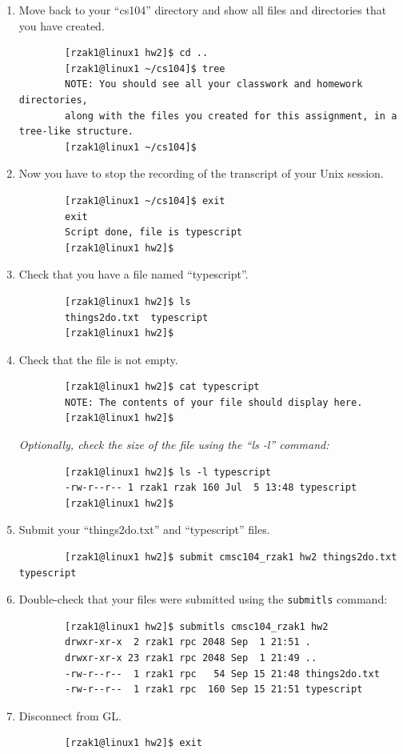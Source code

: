 \documentclass[letter,11pt]{article}
\begin{document}
\begin{enumerate}
    \item Move back to your ``cs104'' directory and show all files and directories that you have created.
    \begin{verbatim}
        [rzak1@linux1 hw2]$ cd ..
        [rzak1@linux1 ~/cs104]$ tree
        NOTE: You should see all your classwork and homework directories, 
        along with the files you created for this assignment, in a tree-like structure.
        [rzak1@linux1 ~/cs104]$\end{verbatim}
    \item Now you have to stop the recording of the transcript of your Unix session.
    \begin{verbatim}
        [rzak1@linux1 ~/cs104]$ exit
        exit
        Script done, file is typescript
        [rzak1@linux1 hw2]$\end{verbatim}
    \item Check that you have a file named ``typescript''.
    \begin{verbatim}
        [rzak1@linux1 hw2]$ ls
        things2do.txt  typescript
        [rzak1@linux1 hw2]$\end{verbatim}
    \item Check that the file is not empty.
    \begin{verbatim}
        [rzak1@linux1 hw2]$ cat typescript
        NOTE: The contents of your file should display here.
        [rzak1@linux1 hw2]$\end{verbatim}
    \textit{Optionally, check the size of the file using the ``ls -l'' command:}
    \begin{verbatim}
        [rzak1@linux1 hw2]$ ls -l typescript
        -rw-r--r-- 1 rzak1 rzak 160 Jul  5 13:48 typescript
        [rzak1@linux1 hw2]$\end{verbatim}
    \item Submit your ``things2do.txt'' and ``typescript'' files.
    \begin{verbatim}
        [rzak1@linux1 hw2]$ submit cmsc104_rzak1 hw2 things2do.txt typescript\end{verbatim}
    \item Double-check that your files were submitted using the \texttt{submitls} command:
    \begin{verbatim}
        [rzak1@linux1 hw2]$ submitls cmsc104_rzak1 hw2
        drwxr-xr-x  2 rzak1 rpc 2048 Sep  1 21:51 .
        drwxr-xr-x 23 rzak1 rpc 2048 Sep  1 21:49 ..
        -rw-r--r--  1 rzak1 rpc   54 Sep 15 21:48 things2do.txt
        -rw-r--r--  1 rzak1 rpc  160 Sep 15 21:51 typescript\end{verbatim}
    \item Disconnect from GL.
    \begin{verbatim}
        [rzak1@linux1 hw2]$ exit\end{verbatim}
\end{enumerate}
\end{document}
